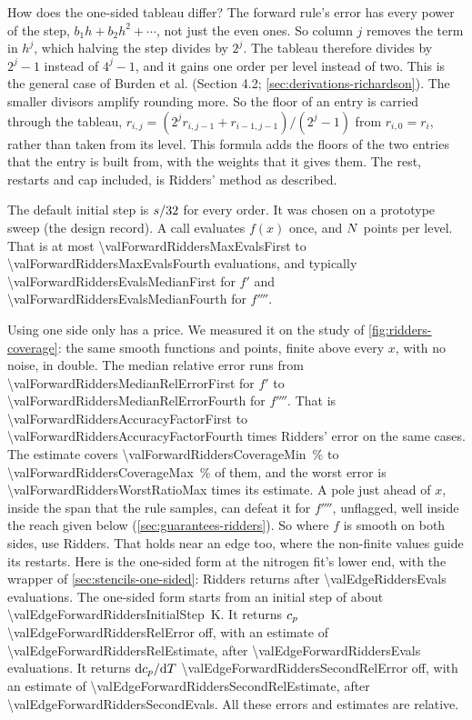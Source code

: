 How does the one-sided tableau differ? The forward rule's error has every power of the step,
$b_1 h + b_2 h^2 + \cdots$, not just the even ones. So column $j$ removes the term in $h^j$, which halving the step
divides by $2^j$. The tableau therefore divides by $2^j - 1$ instead of $4^j - 1$, and it gains one order per level
instead of two. This is the general case of Burden et al.\cite{burden2016} (Section 4.2;
\cref{sec:derivations-richardson}). The smaller divisors amplify rounding more. So the floor of an entry is carried
through the tableau, $r_{i,j} = (2^j r_{i,j-1} + r_{i-1,j-1}) / (2^j - 1)$ from $r_{i,0} = r_i$, rather than taken
from its level. This formula adds the floors of the two entries that the entry is built from, with the weights that
it gives them. The rest, restarts and cap included, is Ridders' method as described.

The default initial step is $s / \num{32}$ for every order. It was chosen on a prototype
sweep (the design record). A call evaluates $f(x)$ once, and $N$ points per level. That is at most
\num{\valForwardRiddersMaxEvalsFirst} to \num{\valForwardRiddersMaxEvalsFourth} evaluations, and typically
\num{\valForwardRiddersEvalsMedianFirst} for $f'$ and \num{\valForwardRiddersEvalsMedianFourth} for $f''''$.

Using one side only has a price. We measured it on the study of \cref{fig:ridders-coverage}: the same smooth
functions and points, finite above every $x$, with no noise, in double. The median relative error runs from
\num{\valForwardRiddersMedianRelErrorFirst} for $f'$ to \num{\valForwardRiddersMedianRelErrorFourth} for $f''''$.
That is \num{\valForwardRiddersAccuracyFactorFirst} to \num{\valForwardRiddersAccuracyFactorFourth} times Ridders'
error on the same cases. The estimate covers \SI{\valForwardRiddersCoverageMin}{\percent} to
\SI{\valForwardRiddersCoverageMax}{\percent} of them, and the worst error is \num{\valForwardRiddersWorstRatioMax}
times its estimate. A pole just ahead of $x$, inside the span that the rule samples, can defeat it for $f''''$,
unflagged, well inside the reach given below (\cref{sec:guarantees-ridders}). So where $f$ is smooth on both sides,
use Ridders. That holds near an edge too, where the non-finite values guide its restarts. Here is the one-sided form
at the nitrogen fit's lower end, with the wrapper of \cref{sec:stencils-one-sided}:
Ridders returns \valEdgeRiddersStatus{} after \num{\valEdgeRiddersEvals} evaluations. The one-sided form starts
from an initial step of about \SI{\valEdgeForwardRiddersInitialStep}{\kelvin}. It returns $c_p$
\num{\valEdgeForwardRiddersRelError} off, with an estimate of \num{\valEdgeForwardRiddersRelEstimate}, after
\num{\valEdgeForwardRiddersEvals} evaluations. It returns $\mathrm{d} c_p / \mathrm{d} T$ \num{\valEdgeForwardRiddersSecondRelError}
off, with an estimate of \num{\valEdgeForwardRiddersSecondRelEstimate}, after \num{\valEdgeForwardRiddersSecondEvals}.
All these errors and estimates are relative.

